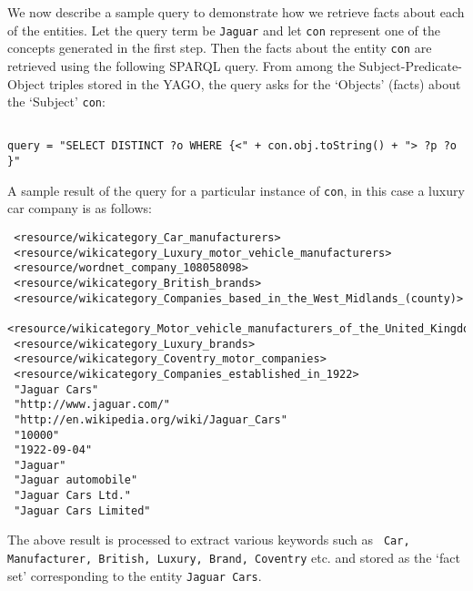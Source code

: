 \documentclass[a4paper,12pt]{report}
\begin{document}
We now describe a sample query to demonstrate how we retrieve facts
about each of the entities. Let the query term be {\tt Jaguar} and let
{\tt con} represent one of the concepts generated in the first
step. Then the facts about the entity {\tt con} are retrieved using
the following SPARQL query. From among the Subject-Predicate-Object
triples stored in the YAGO, the query asks for the `Objects' (facts)
about the `Subject' {\tt con}:
\begin{verbatim}

query = "SELECT DISTINCT ?o WHERE {<" + con.obj.toString() + "> ?p ?o }"

\end{verbatim}
A sample result of the query for a particular instance of {\tt con},
in this case a luxury car company is as follows:
\begin{verbatim}
 <resource/wikicategory_Car_manufacturers>                                 
 <resource/wikicategory_Luxury_motor_vehicle_manufacturers>                
 <resource/wordnet_company_108058098>                                      
 <resource/wikicategory_British_brands>                                    
 <resource/wikicategory_Companies_based_in_the_West_Midlands_(county)>     
 <resource/wikicategory_Motor_vehicle_manufacturers_of_the_United_Kingdom> 
 <resource/wikicategory_Luxury_brands>                                     
 <resource/wikicategory_Coventry_motor_companies>                          
 <resource/wikicategory_Companies_established_in_1922>                     
 "Jaguar Cars"                                                                                       
 "http://www.jaguar.com/"                                                                            
 "http://en.wikipedia.org/wiki/Jaguar_Cars"                                                          
 "10000"                                                                                             
 "1922-09-04"                                                                                        
 "Jaguar"                                                                                            
 "Jaguar automobile"                                                                                 
 "Jaguar Cars Ltd."
 "Jaguar Cars Limited"
\end{verbatim}
The above result is processed to extract various keywords such as {\tt
  Car, Manufacturer, British, Luxury, Brand, Coventry} etc. and stored
as the `fact set' corresponding to the entity {\tt Jaguar Cars}.
\end{document}
